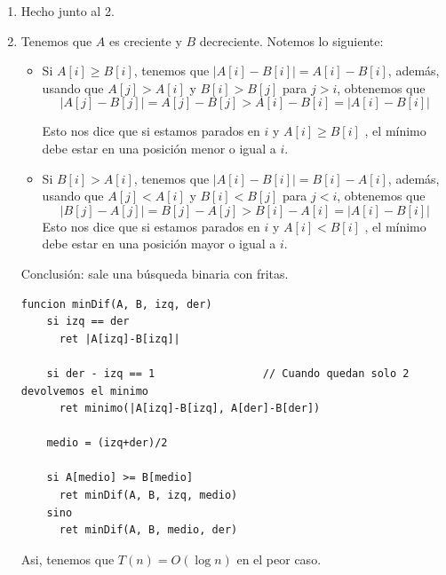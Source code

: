 \begin{enumerate}[label=\arabic*)]
  \item Hecho junto al 2.

  \item Tenemos que $A$ es creciente y $B$ decreciente. Notemos lo siguiente:
                \begin{itemize}
                    \item Si $A[i] \geq B[i]$, tenemos que $|A[i]-B[i]| = A[i] - B[i]$, además, 
                            usando que $A[j] > A[i]$ y $B[i] > B[j]$ para $j > i$, obtenemos que
                            $$
                            |A[j]-B[j]| = A[j]-B[j] > A[i] - B[i] = |A[i]-B[i]|
                            $$

                            Esto nos dice que si estamos parados en $i$ y $A[i] \geq B[i]$ , el mínimo debe estar en una posición menor o igual a $i$.
                    \item Si $B[i] > A[i]$, tenemos que $|A[i]-B[i]| = B[i]-A[i]$, además,
                            usando que $A[j] < A[i]$ y $B[i] < B[j]$ para $j < i$, obtenemos que
                            $$
                            |B[j]-A[j]| = B[j]-A[j] > B[i] - A[i] = |A[i]-B[i]|
                            $$
                            Esto nos dice que si estamos parados en $i$ y $A[i] < B[i]$ , el mínimo debe estar en una posición mayor o igual a $i$.
                \end{itemize}
        Conclusión: sale una búsqueda binaria con fritas.

        \begin{tcolorbox}
          \begin{lstlisting}
funcion minDif(A, B, izq, der)          
    si izq == der                          
      ret |A[izq]-B[izq]|                           
          
    si der - izq == 1                 // Cuando quedan solo 2 devolvemos el minimo
      ret minimo(|A[izq]-B[izq], A[der]-B[der])

    medio = (izq+der)/2

    si A[medio] >= B[medio]
      ret minDif(A, B, izq, medio)
    sino
      ret minDif(A, B, medio, der)
\end{lstlisting}
        \end{tcolorbox}

Asi, tenemos que $T(n) = O(\log n)$ en el peor caso.
\end{enumerate}

\begin{aportes}
  \item {}
\end{aportes}

\fin

